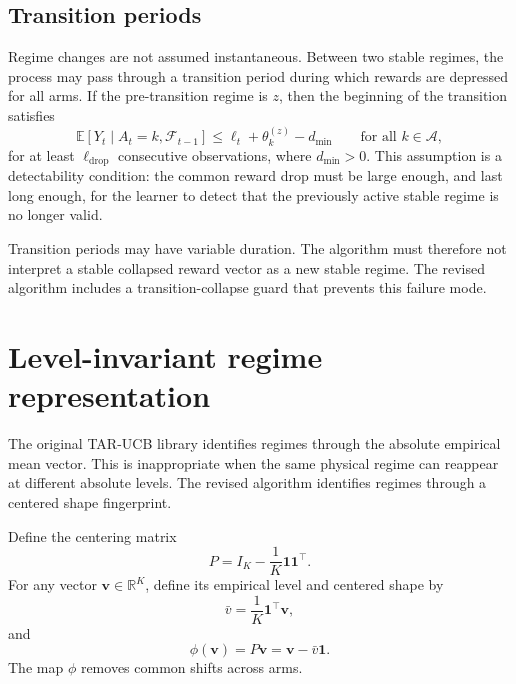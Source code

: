 \documentclass[11pt]{article}
\newcommand{\A}{\mathcal A}
\newcommand{\F}{\mathcal F}
\newcommand{\E}{\mathbb E}
\newcommand{\R}{\mathbb R}
\newcommand{\one}{\bm 1}
\begin{document}
\subsection{Transition periods}
\label{subsec:transitions}

Regime changes are not assumed instantaneous. Between two stable regimes, the process may pass through a transition period during which rewards are depressed for all arms. If the pre-transition regime is $z$, then the beginning of the transition satisfies
\begin{equation}
\label{eq:drop_condition}
\E[Y_t\mid A_t=k,\F_{t-1}]
\leq
\ell_t+\theta_k^{(z)}-d_{\min}
\qquad \text{for all } k\in\A,
\end{equation}
for at least $\ell_{\mathrm{drop}}$ consecutive observations, where $d_{\min}>0$. This assumption is a detectability condition: the common reward drop must be large enough, and last long enough, for the learner to detect that the previously active stable regime is no longer valid.

Transition periods may have variable duration. The algorithm must therefore not interpret a stable collapsed reward vector as a new stable regime. The revised algorithm includes a transition-collapse guard that prevents this failure mode.

\section{Level-invariant regime representation}
\label{sec:shape_representation}

The original TAR-UCB library identifies regimes through the absolute empirical mean vector. This is inappropriate when the same physical regime can reappear at different absolute levels. The revised algorithm identifies regimes through a centered shape fingerprint.

Define the centering matrix
\begin{equation}
\label{eq:centering_matrix}
P
=
I_K-\frac{1}{K}\one\one^\top .
\end{equation}
For any vector $\bm v\in\R^K$, define its empirical level and centered shape by
\begin{equation}
\label{eq:level_definition}
\bar v
=
\frac{1}{K}\one^\top \bm v,
\end{equation}
and
\begin{equation}
\label{eq:shape_map}
\phi(\bm v)
=
P\bm v
=
\bm v-\bar v\one .
\end{equation}
The map $\phi$ removes common shifts across arms.
\end{document}
